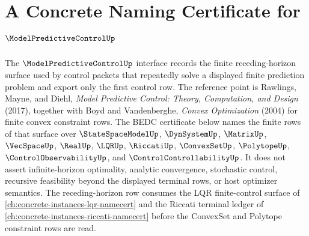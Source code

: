 \chapter{A Concrete Naming Certificate for $\ModelPredictiveControlUp$}
\label{ch:concrete-instances-modelpredictivecontrol-namecert}

The $\ModelPredictiveControlUp$ interface records the finite receding-horizon
surface used by control packets that repeatedly solve a displayed finite
prediction problem and export only the first control row. The reference point
is Rawlings, Mayne, and Diehl, \emph{Model Predictive Control: Theory,
Computation, and Design} (2017), together with Boyd and Vandenberghe,
\emph{Convex Optimization} (2004) for finite convex constraint rows. The BEDC
certificate below names the finite rows of that surface over
$\StateSpaceModelUp$, $\DynSystemUp$, $\MatrixUp$, $\VecSpaceUp$, $\RealUp$,
$\LQRUp$, $\RiccatiUp$, $\ConvexSetUp$, $\PolytopeUp$,
$\ControlObservabilityUp$, and $\ControlControllabilityUp$. It does not assert
infinite-horizon optimality, analytic convergence, stochastic control,
recursive feasibility beyond the displayed terminal rows, or host optimizer
semantics.
The receding-horizon row consumes the LQR finite-control surface of
\autoref{ch:concrete-instances-lqr-namecert} and the Riccati terminal ledger
of \autoref{ch:concrete-instances-riccati-namecert} before the ConvexSet and
Polytope constraint rows are read.

